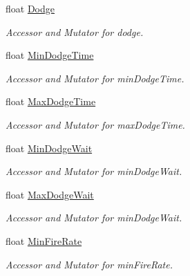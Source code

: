 \begin{DoxyCompactItemize}
float \mbox{\hyperlink{class_individual_a8daea02958bdf86b68fc063556a12a56}{Dodge}}
\begin{DoxyCompactList}\small\item\em Accessor and Mutator for dodge. \end{DoxyCompactList}\item 
float \mbox{\hyperlink{class_individual_ad5b02d49418b96acb978aeed30bd7149}{Min\+Dodge\+Time}}
\begin{DoxyCompactList}\small\item\em Accessor and Mutator for min\+Dodge\+Time. \end{DoxyCompactList}\item 
float \mbox{\hyperlink{class_individual_a280784e76616e219c0b9428fd5d78744}{Max\+Dodge\+Time}}
\begin{DoxyCompactList}\small\item\em Accessor and Mutator for max\+Dodge\+Time. \end{DoxyCompactList}\item 
float \mbox{\hyperlink{class_individual_af61b42078f68777b3ecf9cee2902af7a}{Min\+Dodge\+Wait}}
\begin{DoxyCompactList}\small\item\em Accessor and Mutator for min\+Dodge\+Wait. \end{DoxyCompactList}\item 
float \mbox{\hyperlink{class_individual_a625737f01684ea5a2bbe4f887582ee53}{Max\+Dodge\+Wait}}
\begin{DoxyCompactList}\small\item\em Accessor and Mutator for min\+Dodge\+Wait. \end{DoxyCompactList}\item 
float \mbox{\hyperlink{class_individual_acf1b957b3e4d0c36d76c07590047cc29}{Min\+Fire\+Rate}}
\begin{DoxyCompactList}\small\item\em Accessor and Mutator for min\+Fire\+Rate. \end{DoxyCompactList}\item 

\end{DoxyCompactItemize}

